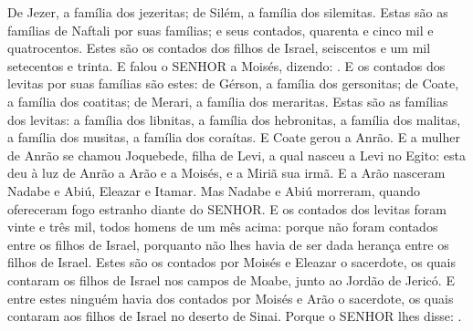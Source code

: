 {  De Jezer, a família dos jezeritas; de Silém, a família dos silemitas.
  Estas são as famílias de Naftali por suas famílias; e seus contados, quarenta e cinco mil e quatrocentos.
  Estes são os contados dos filhos de Israel, seiscentos e um mil setecentos e trinta.
  E falou o SENHOR a Moisés, dizendo:
  .
  E os contados dos levitas por suas famílias são estes: de Gérson, a família dos gersonitas; de Coate, a família dos coatitas; de Merari, a família dos meraritas.
  Estas são as famílias dos levitas: a família dos libnitas, a família dos hebronitas, a família dos malitas, a família dos musitas, a família dos coraítas. E Coate gerou a Anrão.
  E a mulher de Anrão se chamou Joquebede, filha de Levi, a qual nasceu a Levi no Egito: esta deu à luz de Anrão a Arão e a Moisés, e a Miriã sua irmã.
  E a Arão nasceram Nadabe e Abiú, Eleazar e Itamar.
  Mas Nadabe e Abiú morreram, quando ofereceram fogo estranho diante do SENHOR.
  E os contados dos levitas foram vinte e três mil, todos homens de um mês acima: porque não foram contados entre os filhos de Israel, porquanto não lhes havia de ser dada herança entre os filhos de Israel.
  Estes são os contados por Moisés e Eleazar o sacerdote, os quais contaram os filhos de Israel nos campos de Moabe, junto ao Jordão de Jericó.
  E entre estes ninguém havia dos contados por Moisés e Arão o sacerdote, os quais contaram aos filhos de Israel no deserto de Sinai.
  Porque o SENHOR lhes disse: .
\par }

